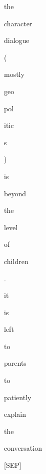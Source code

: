 \documentclass[varwidth=150mm]{standalone}
\begin{document}
\begin{CJK*}{UTF8}{gbsn}
{{{\colorbox{red!1.9858444929122925}{\strut the} \colorbox{red!4.866761207580566}{\strut character} \colorbox{red!26.517223358154297}{\strut dialogue} \colorbox{red!6.3625898361206055}{\strut (} \colorbox{red!1.7671430110931396}{\strut mostly} \colorbox{red!0.0}{\strut geo}\colorbox{red!1.4101576805114746}{\strut pol}\colorbox{red!3.145263433456421}{\strut itic}\colorbox{red!1.0199187994003296}{\strut s} \colorbox{red!0.0}{\strut )} \colorbox{red!0.0}{\strut is} \colorbox{red!0.0}{\strut beyond} \colorbox{red!0.0}{\strut the} \colorbox{red!1.1398086547851562}{\strut level} \colorbox{red!0.0}{\strut of} \colorbox{red!1.1526694297790527}{\strut children} \colorbox{red!0.0}{\strut .} \colorbox{red!1.379433274269104}{\strut it} \colorbox{red!8.206978797912598}{\strut is} \colorbox{red!0.0}{\strut left} \colorbox{red!0.0}{\strut to} \colorbox{red!13.501893043518066}{\strut parents} \colorbox{red!11.650818824768066}{\strut to} \colorbox{red!5.352983474731445}{\strut patiently} \colorbox{red!3.735151529312134}{\strut explain} \colorbox{red!10.76503849029541}{\strut the} \colorbox{red!3.559293270111084}{\strut conversation} \colorbox{red!4.432408809661865}{\strut [SEP]}
}}}
\end{CJK*}
\end{document}
